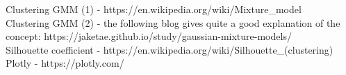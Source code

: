 Clustering GMM (1) - https://en.wikipedia.org/wiki/Mixture\_model \\

Clustering GMM (2)  - the following blog gives quite a good explanation of the concept: https://jaketae.github.io/study/gaussian-mixture-models/ \\

Silhouette coefficient - https://en.wikipedia.org/wiki/Silhouette\_(clustering) \\

Plotly - https://plotly.com/ \\


\vspace{10mm}